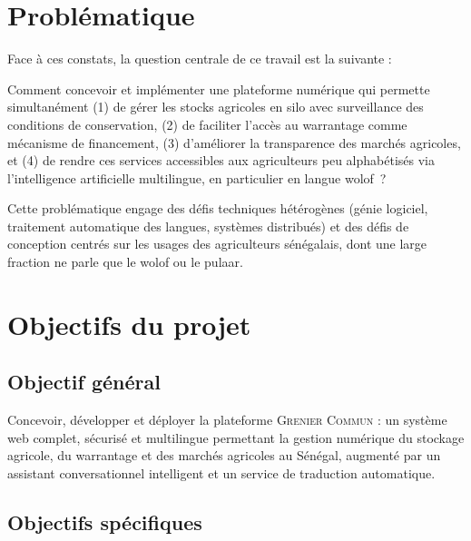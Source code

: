\documentclass[12pt,a4paper,twoside]{report}
\newcommand{\gc}{\textsc{Grenier Commun}}
\begin{document}
\section{Problématique}

Face à ces constats, la question centrale de ce travail est la suivante :

\begin{definitionbox}
Comment concevoir et implémenter une plateforme numérique qui permette
simultanément (1) de gérer les stocks agricoles en silo avec surveillance
des conditions de conservation, (2) de faciliter l'accès au warrantage comme
mécanisme de financement, (3) d'améliorer la transparence des marchés agricoles,
et (4) de rendre ces services accessibles aux agriculteurs peu alphabétisés via
l'intelligence artificielle multilingue, en particulier en langue wolof~?
\end{definitionbox}

Cette problématique engage des défis techniques hétérogènes (génie logiciel,
traitement automatique des langues, systèmes distribués) et des défis de
conception centrés sur les usages des agriculteurs sénégalais, dont une large
fraction ne parle que le wolof ou le pulaar.

\section{Objectifs du projet}

\subsection{Objectif général}

Concevoir, développer et déployer la plateforme \gc{} : un système web complet,
sécurisé et multilingue permettant la gestion numérique du stockage agricole,
du warrantage et des marchés agricoles au Sénégal, augmenté par un assistant
conversationnel intelligent et un service de traduction automatique.

\subsection{Objectifs spécifiques}
\end{document}
